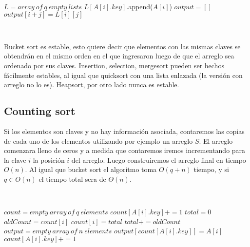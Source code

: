 ~

\begin{algorithmic}[1]
    \State $L = array\ of\ q\ empty\ lists$ 
     
      \State $L[A[i].key]$.append($A[i]$)
    \EndFor
    \State $output = []$
     
       
	\State $output[i+j] = L[i][j]$
      \EndFor
    \EndFor
 \EndFunction
\end{algorithmic}

~

Bucket sort es estable, esto quiere decir que elementos con las mismas claves se obtendr\'an en el mismo orden en el que ingresaron luego de que el arreglo sea ordenado por sus claves. Insertion, selection, mergesort pueden ser hechos f\'acilmente estables, al igual que quicksort con una lista enlazada (la versi\'on con arreglo no lo es). Heapsort, por otro lado nunca es estable.

\subsection{Counting sort}

Si los elementos son claves y no hay informaci\'on asociada, contaremos las copias de cada uno de los elementos utilizando por ejemplo un arreglo $S$. El arreglo comenzara lleno de ceros y a medida que contaremos iremos incrementando para la clave $i$ la posici\'on $i$ del arreglo. Luego construiremos el arreglo final en tiempo $O(n)$. Al igual que bucket sort el algoritmo toma $O(q+n)$ tiempo, y si $q \in O(n)$ el tiempo total sera de $\Theta(n)$.

~

\begin{algorithmic}[1]
    \State $count = empty\ array\ of\ q\ elements$ 
     
      \State $count[A[i].key] += 1$
    \EndFor
    \State $total = 0$
     
      \State $oldCount = count[i]$
      \State $count[i] = total$
      \State $total += oldCount$
    \EndFor
    \State $output = empty\ array\ of\ n\ elements$ 
     
      \State $output[count[A[i].key]] = A[i]$
      \State $count[A[i].key] += 1$
    \EndFor
 \EndFunction
\end{algorithmic}


